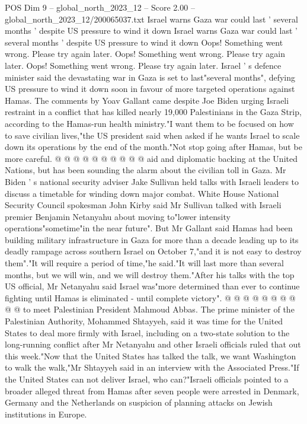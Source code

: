 \begin{textsample}{POS Dim 9 – global\_north\_2023\_12 – Score 2.00 – global\_north\_2023\_12/200065037.txt}  \label{ex:f9_pos_162}
Israel warns Gaza war could last ' several months ' despite US pressure to wind it down Israel warns Gaza war could last ' several months ' despite US pressure to wind it down Oops!
Something went wrong.
Please try again later.
Oops!
Something went wrong.
Please try again later.
Oops!
Something went wrong.
Please try again later.
Israel ' s defence minister said the devastating war in Gaza is set to last"several months", defying US pressure to wind it down soon in favour of more targeted operations against Hamas.
The comments by Yoav Gallant came despite Joe Biden urging Israeli restraint in a conflict that has killed nearly 19,000 Palestinians in the Gaza Strip, according to the Hamas-run health ministry."I want them to be focused on how to save civilian lives,"the US president said when asked if he wants Israel to scale down its operations by the end of the month."Not stop going after Hamas, but be more careful. @ @ @ @ @ @ @ @ @ @ aid and diplomatic backing at the United Nations, but has been sounding the alarm about the civilian toll in Gaza.
Mr Biden ' s national security adviser Jake Sullivan held talks with Israeli leaders to discuss a timetable for winding down major combat.
White House National Security Council spokesman John Kirby said Mr Sullivan talked with Israeli premier Benjamin Netanyahu about moving to"lower intensity operations"sometime"in the near future".
But Mr Gallant said Hamas had been building military infrastructure in Gaza for more than a decade leading up to its deadly rampage across southern Israel on October 7,"and it is not easy to destroy them"."It will require a period of time,"he said."It will last more than several months, but we will win, and we will destroy them."After his talks with the top US official, Mr Netanyahu said Israel was"more determined than ever to continue fighting until Hamas is eliminated - until complete victory". @ @ @ @ @ @ @ @ @ @ to meet Palestinian President Mahmoud Abbas.
The prime minister of the Palestinian Authority, Mohammed Shtayyeh, said it was time for the United States to deal more firmly with Israel, including on a two-state solution to the long-running conflict after Mr Netanyahu and other Israeli officials ruled that out this week."Now that the United States has talked the talk, we want Washington to walk the walk,"Mr Shtayyeh said in an interview with the Associated Press."If the United States can not deliver Israel, who can?"Israeli officials pointed to a broader alleged threat from Hamas after seven people were arrested in Denmark, Germany and the Netherlands on suspicion of planning attacks on Jewish institutions in Europe.

\end{textsample}
